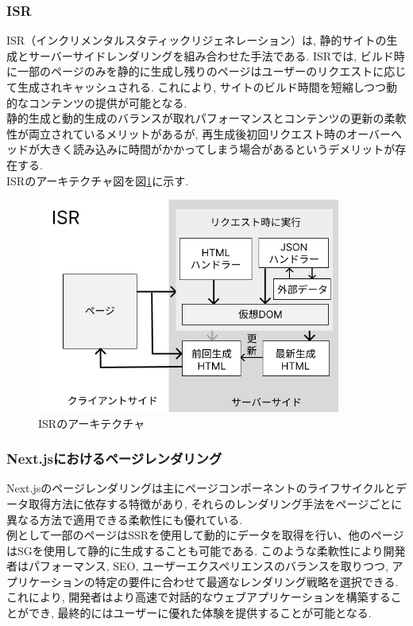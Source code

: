 \subsubsection{ISR}
ISR（インクリメンタルスタティックリジェネレーション）は, 静的サイトの生成とサーバーサイドレンダリングを組み合わせた手法である. 
ISRでは, ビルド時に一部のページのみを静的に生成し残りのページはユーザーのリクエストに応じて生成されキャッシュされる. 
これにより, サイトのビルド時間を短縮しつつ動的なコンテンツの提供が可能となる.\\
静的生成と動的生成のバランスが取れパフォーマンスとコンテンツの更新の柔軟性が両立されているメリットがあるが, 再生成後初回リクエスト時のオーバーヘッドが大きく読み込みに時間がかかってしまう場合があるというデメリットが存在する.\\
ISRのアーキテクチャ図を図\ref{fig:ISR-image}に示す.

\begin{figure}[htbp]
	\begin{center}
		\includegraphics[width=100mm]{./images/ISR.png}
		\caption{ISRのアーキテクチャ}\label{fig:ISR-image}
	\end{center}
\end{figure}

\subsubsection{Next.jsにおけるページレンダリング}
Next.jsのページレンダリングは主にページコンポーネントのライフサイクルとデータ取得方法に依存する特徴があり, それらのレンダリング手法をページごとに異なる方法で適用できる柔軟性にも優れている.\\
例として一部のページはSSRを使用して動的にデータを取得を行い、他のページはSGを使用して静的に生成することも可能である.
このような柔軟性により開発者はパフォーマンス, SEO, ユーザーエクスペリエンスのバランスを取りつつ, アプリケーションの特定の要件に合わせて最適なレンダリング戦略を選択できる.
これにより, 開発者はより高速で対話的なウェブアプリケーションを構築することができ, 最終的にはユーザーに優れた体験を提供することが可能となる.

